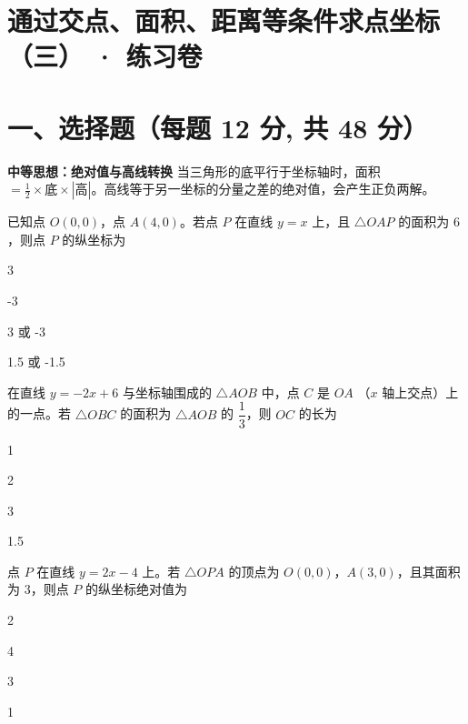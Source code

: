 \documentclass{exam-zh}
\begin{document}
\section*{通过交点、面积、距离等条件求点坐标（三） · 练习卷}

\section*{一、选择题（每题 12 分, 共 48 分）}


\begin{keyideabox}
  \textbf{中等思想：绝对值与高线转换}
  当三角形的底平行于坐标轴时，面积 $= \frac{1}{2} \times \text{底} \times |\text{高}|$。高线等于另一坐标的分量之差的绝对值，会产生正负两解。
\end{keyideabox}



\begin{question}[points=12]
  已知点 $O(0, 0)$，点 $A(4, 0)$。若点 $P$ 在直线 $y = x$ 上，且 $\triangle OAP$ 的面积为 $6$，则点 $P$ 的纵坐标为
  \begin{choices}
    \item 3
    \item -3
    \item 3 或 -3
    \item 1.5 或 -1.5
  \end{choices}
\end{question}



\begin{question}[points=12]
  在直线 $y = -2x + 6$ 与坐标轴围成的 $\triangle AOB$ 中，点 $C$ 是 $OA$ （$x$ 轴上交点）上的一点。若 $\triangle OBC$ 的面积为 $\triangle AOB$ 的 $\dfrac{1}{3}$，则 $OC$ 的长为
  \begin{choices}
    \item 1
    \item 2
    \item 3
    \item 1.5
  \end{choices}
\end{question}



\begin{question}[points=12]
  点 $P$ 在直线 $y = 2x - 4$ 上。若 $\triangle OPA$ 的顶点为 $O(0, 0)$，$A(3, 0)$，且其面积为 $3$，则点 $P$ 的纵坐标绝对值为
  \begin{choices}
    \item 2
    \item 4
    \item 3
    \item 1
  \end{choices}
\end{question}
\end{document}
